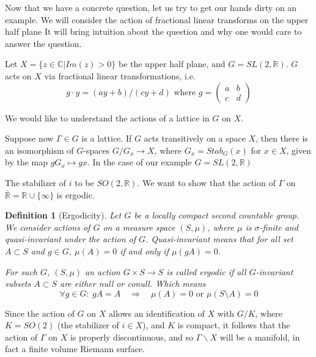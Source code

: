 \documentclass[
  12pt
]{article}
\numberwithin{equation}{section}
\newtheorem{defn}{Definition}[thm]
\theoremstyle{plain}
\newcommand{\G}{\ensuremath{G}\xspace}
\newcommand{\bbr}{\ensuremath{\mathbb{R}}\xspace}
\newcommand{\bbc}{\ensuremath{\mathbb{C}}\xspace}
\newcommand{\sltr}{\ensuremath{SL(2, \mathbb{R})}\xspace}
\begin{document}
  Now that we have a concrete question, let us try to get our hands dirty
  on an example. We will consider the action of fractional linear transforms on
  the upper half plane
  It will bring intuition about the question and why one would care to
  answer the question.

  Let $X = \{z \in \bbc  | Im(z) >0\}$ be the upper half plane, and $G = \sltr$.
  \G acts on $X$ via fractional linear transformations, i.e.
  $$
  g \cdot y = (ay + b)/(cy +d) \text{ where } g= \begin{pmatrix}
    a & b \\
    c & d 
  \end{pmatrix}
  $$

  We would like to understand the actions of a lattice in \G on $X$.

  Suppose now $\Gamma \in G$ is a lattice. 
  If $G$ acts transitively on a space $X$, then there is an isomorphism
  of $G$-spaces $G/G_x \rightarrow X$, where $G_x = Stab_G (x)$ for
  $x \in X$, given by the map $gG_x \mapsto gx$. In the case of our
  example $G = SL(2, \mathbb{R})$

  The stabilizer of $i$ to be $SO(2,\mathbb{R})$.
  We want to show that the action of $\Gamma$ on
  $\bar{\mathbb{R}} = \bbr \cup \{\infty\}$ is ergodic.

  \begin{defn}[Ergodicity]
    Let \G be a locally compact second countable group.
    We consider actions of \G on a measure space $(S, \mu)$, where $\mu$ is
    $\sigma$-finite and quasi-invariant under the action of \G.
    \emph{Quasi-invariant} means that for all set $A \subset S$ and $g \in G$,
    $\mu(A) = 0$ if and only if $\mu(gA) = 0$.

    For such \G, $(S, \mu)$ an action $G \times S \rightarrow S$ is called
    ergodic if all $G$-invariant subsets $A\subset S$ are either null or
    conull.
    Which means 
    $$
    \forall g\in G:\ gA = A \quad \Rightarrow \quad \mu(A)=0 \text{ or } \mu(S\setminus A)=0
    $$
  \end{defn}


  Since the action of $G$ on $X$
  allows an identification of $X$ with $G/K$, where $K = SO(2)$ (the
  stabilizer of $i \in X$), and $K$ is compact, it follows that the
  action of $\Gamma$ on $X$ is properly discontinuous, and so
  $\Gamma\backslash X$ will be a manifold, in fact a finite volume
  Riemann surface.
\end{document}
